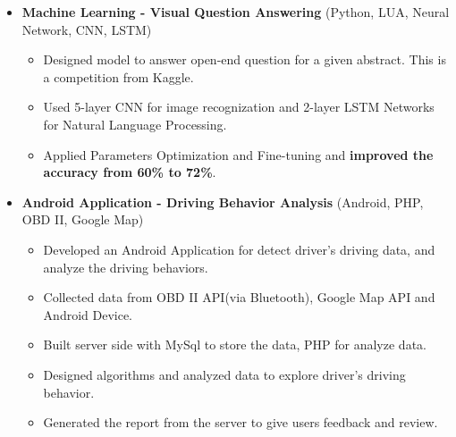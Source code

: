 \documentclass[letterpaper,10pt]{article}
\begin{document}
\begin{itemize}
	
	\item [] \textbf{Machine Learning - Visual Question Answering} (Python, LUA, Neural Network, CNN, LSTM)
	\setlength\itemsep{0em}
	\begin{itemize}[topsep=-1em]
	\setlength\itemindent{-0.25in}  %
	\setlength\itemsep{-0.1em} %
		\item [\textbullet]Designed model to answer open-end question for a given abstract. This is a competition from Kaggle.
		\item [\textbullet]Used 5-layer CNN for image recognization and 2-layer LSTM Networks for Natural Language Processing.
		\item [\textbullet]Applied Parameters Optimization and Fine-tuning and \textbf{improved the accuracy from 60\% to 72\%}.
	\end{itemize}
	
	
		
	
	\item [] \textbf{Android Application -  Driving Behavior Analysis} (Android, PHP, OBD II, Google Map)
	\setlength\itemsep{0em}
	
	\begin{itemize}[topsep=-1em]
	\setlength\itemindent{-0.25in}  %
	\setlength\itemsep{-0.1em} %
		\item [\textbullet]Developed an Android Application for detect driver\rq s driving data, and analyze the driving behaviors.
		\item [\textbullet]Collected data from OBD II API(via Bluetooth), Google Map API and Android Device. 
		\item [\textbullet]Built server side with MySql to store the data, PHP for analyze data.
		\item [\textbullet]Designed algorithms and analyzed data to explore driver\rq s driving behavior.
		\item [\textbullet]Generated the report from the server to give users feedback and review.
	\end{itemize}
	
	
	
	

\end{itemize}
\end{document}
